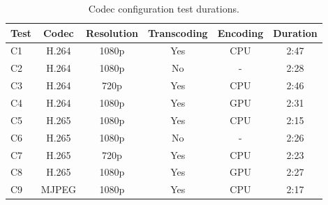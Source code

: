\begin{table}[H]
    \centering
    \caption{Codec configuration test durations.}
    \label{tab:codec_duration}
    \begin{tabular}{@{}lccccc@{}}
        \toprule
        \textbf{Test} & \textbf{Codec} & \textbf{Resolution} & \textbf{Transcoding} & \textbf{Encoding} & \textbf{Duration} \\
        \midrule
        C1 & H.264        & 1080p & Yes & CPU & 2:47 \\
        C2 & H.264        & 1080p & No  & \-- & 2:28 \\
        C3 & H.264        & 720p  & Yes & CPU & 2:46 \\
        C4 & H.264        & 1080p & Yes & GPU & 2:31 \\
        C5 & H.265        & 1080p & Yes & CPU & 2:15 \\
        C6 & H.265        & 1080p & No  & \-- & 2:26 \\
        C7 & H.265        & 720p  & Yes & CPU & 2:23 \\
        C8 & H.265        & 1080p & Yes & GPU & 2:27 \\
        C9 & MJPEG        & 1080p & Yes & CPU & 2:17 \\
        \bottomrule
    \end{tabular}
\end{table}
